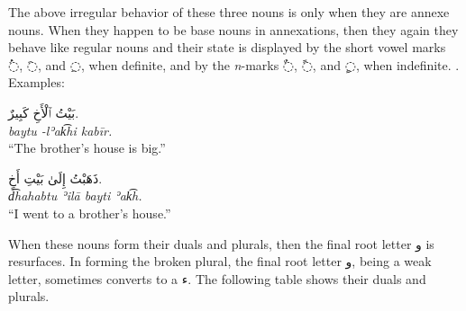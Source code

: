 \documentclass[
  10pt,
]{book}
\begin{document}
The above irregular behavior of these three nouns is only when they are annexe nouns. When they happen to be base nouns in annexations, then they again they behave like regular nouns and their state is displayed by the short vowel marks \foreignlanguage{arabic}{◌ُ}, \foreignlanguage{arabic}{◌َ}, and \foreignlanguage{arabic}{◌ِ}, when definite, and by the \emph{n}-marks
\foreignlanguage{arabic}{◌ٌ},
\foreignlanguage{arabic}{◌ً}, and
\foreignlanguage{arabic}{◌ٍ}, when indefinite.
. Examples:

\foreignlanguage{arabic}{بَيْتُ ٱلْأَخِ کَبِيرٌ.}\\
\emph{baytu -lʾak͡hi kabīr.}\\
\enquote{The brother's house is big.}

\foreignlanguage{arabic}{ذَهَبْتُ إِلَىٰ بَيْتِ أَخٍ.}\\
\emph{d͡hahabtu ʾilā bayti ʾak͡h.}\\
\enquote{I went to a brother's house.}

When these nouns form their duals and plurals, then the final root letter \foreignlanguage{arabic}{و} is resurfaces.
In forming the broken plural, the final root letter \foreignlanguage{arabic}{و}, being a weak letter, sometimes converts to a \foreignlanguage{arabic}{ء}.
The following table shows their duals and plurals.
\end{document}
